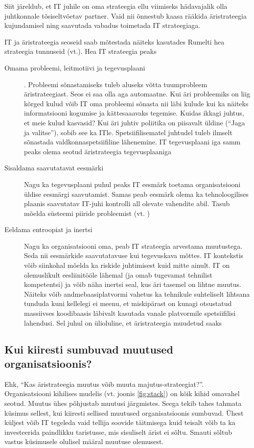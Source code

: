 \documentclass{tufte-book}
\begin{document}
Siit järeldub, et IT juhile on oma strateegia ellu viimiseks hädavajalik olla juhtkonnale tõsiseltvõetav partner. Vaid nii õnnestub kaasa rääkida äristrateegia kujundamisel ning saavutada vabadus toimetada IT strateegiaga. 

IT ja äristrateegia seoseid saab mõtestada näiteks kasutades Rumelti hea strateegia tunnuseid (vt.). Hea IT strateegia peaks
\begin{description}
	\item[Omama probleemi, leitmotiivi ja tegevusplaani]. Probleemi sõnastamiseks tuleb aluseks võtta tuumprobleem äristrateegiast. Seos ei saa olla aga automaatne. Kui äri probleemiks on liig kõrged kulud võib IT oma probleemi sõnasta nii läbi kulude kui ka näiteks informatsiooni kogumise ja kättesaaavaks tegemise. Kuidas ikkagi juhtus, et meie kulud kasvasid? Kui äri juhtiv poliitika on piisavalt üldine (\enquote{Jaga ja valitse}), sobib see ka ITle. Spetsiifilisematel juhtudel tuleb ilmselt sõnastada valdkonnaspetsiifiline lähenemine. IT tegevusplaani iga samm peaks olema seotud äristrateegia tegevusplaaniga
	\item[Sisaldama saavutatavat eesmärki] Nagu ka tegevusplaani puhul peaks IT eesmärk toetama organisatsiooni üldise eesmärgi saavutamist. Samas peab eesmärk olema ka tehnoloogilises plaanis saavutatav IT-juhi kontrolli all olevate vahendite abil. Tasub mõelda süsteemi piiride probleemist (vt. )
	\item[Eeldama entroopiat ja inertsi] Nagu ka organisatsiooni oma, peab IT strateegia arvestama muutustega. Seda nii eesmärkide saavutatavuse kui tegevuskava mõttes. IT kontekstis võib siinkohal mõelda ka riskide juhtimisest kuid mitte ainult. IT on olemuslikult eesliinitööle lähemal (ja omab tugevamat tehnilist kompetentsi) ja võib näha inertsi seal, kus äri tasemel on lihtne muutus. Näiteks võib andmebaasiplatvormi vahetus ka tehnikule suhteliselt lihtsana tunduda kuni kellelegi ei meenu, et miskipärast on kunagi otsustatud massiivses koodibaasis läbivalt kasutada vanale platvormile spetsiifilisi lahendusi. Sel juhul on ülioluline, et äristrateegia muudetud saaks
\end{description}

\subsection{Kui kiiresti sumbuvad muutused organisatsioonis?}
Ehk, \enquote{Kas äristrateegia muutus võib muuta majutus-strateegiat?}. Organisatsiooni kihilises mudelis (vt. joonis \ref{fig:stack}) on kõik kihid omavahel seotud. Muutus ühes põhjustab muutusi järgmistes. Seega tekib tahes tahmata küsimus sellest, kui kiiresti sellised muutused organisatsioonis sumbuvad. Ühest küljest võib IT tegeleda vaid tellija soovide täitmisega kuid teisalt võib ta ka investeerida paindlikku taristusse, mis sisuliselt ärist ei sõltu. Smauti sõltub vastus küsimusele olulisel määral muutuse olemusest.
\end{document}

